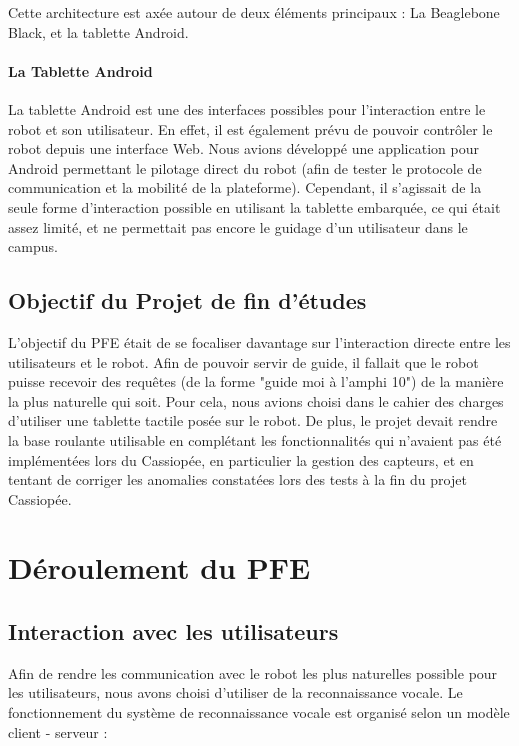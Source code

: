 \documentclass[a4paper,10pt]{report}
\begin{document}
    {Cette architecture est axée autour de deux éléments principaux :
    La Beaglebone Black, et la tablette Android.}

    \subsubsection{La Tablette Android}

    {La tablette Android est une des interfaces possibles pour l'interaction entre le robot
    et son utilisateur. En effet, il est également prévu de pouvoir contrôler le robot
    depuis une interface Web. Nous avions développé une application pour Android
    permettant le pilotage direct du robot (afin de tester le protocole de communication
    et la mobilité de la plateforme). Cependant, il s'agissait de la seule forme d'interaction
    possible en utilisant la tablette embarquée, ce qui était assez limité, et ne permettait
     pas encore le guidage d'un utilisateur dans le campus.}


    \section{Objectif du Projet de fin d'études}

    {L'objectif du PFE était de se focaliser davantage sur l'interaction directe
     entre les utilisateurs et le robot. Afin de pouvoir servir de guide, il
     fallait que le robot puisse recevoir des requêtes (de la forme "guide
     moi à l'amphi 10") de la manière la plus naturelle qui soit. Pour cela,
     nous avions choisi dans le cahier des charges d'utiliser une tablette
     tactile posée sur le robot. De plus, le projet devait rendre la base
     roulante utilisable en complétant les fonctionnalités qui n'avaient pas
     été implémentées lors du Cassiopée, en particulier la gestion des capteurs,
     et en tentant de corriger les anomalies constatées lors des tests à la fin
     du projet Cassiopée.}



  \chapter{Déroulement du PFE}

    \section{Interaction avec les utilisateurs}

    {Afin de rendre les communication avec le robot les plus naturelles possible
    pour les utilisateurs, nous avons choisi d'utiliser de la reconnaissance vocale.
    Le fonctionnement du système de reconnaissance vocale est organisé selon
    un modèle client - serveur :}
\end{document}
